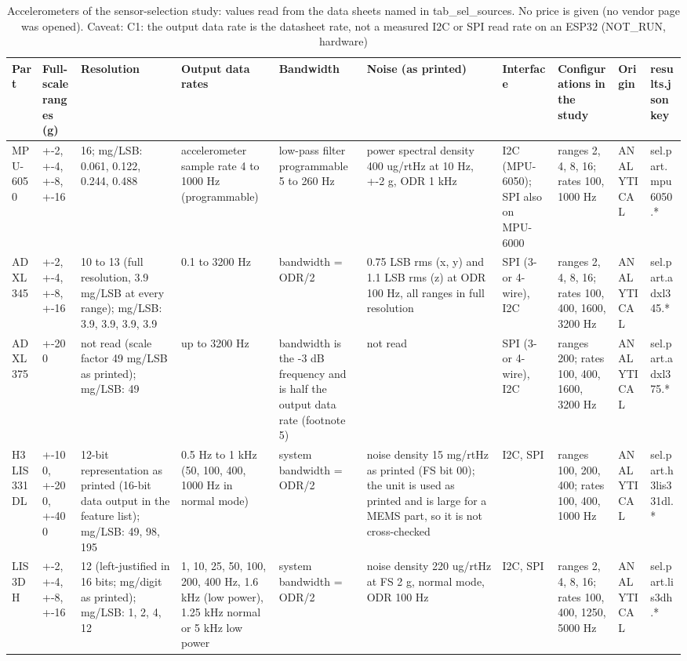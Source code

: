 \begin{table}[t]
\centering
\small
\caption{Accelerometers of the sensor-selection study: values read from the data sheets named in tab\_sel\_sources. No price is given (no vendor page was opened). Caveat: C1: the output data rate is the datasheet rate, not a measured I2C or SPI read rate on an ESP32 (NOT\_RUN, hardware)}
\label{tab:tab_sel_parts}
\begin{tabular}{llllllllll}
\toprule
Part & Full-scale ranges (g) & Resolution & Output data rates & Bandwidth & Noise (as printed) & Interface & Configurations in the study & Origin & results.json key \\
\midrule
MPU-6050 & +-2, +-4, +-8, +-16 & 16; mg/LSB: 0.061, 0.122, 0.244, 0.488 & accelerometer sample rate 4 to 1000 Hz (programmable) & low-pass filter programmable 5 to 260 Hz & power spectral density 400 ug/rtHz at 10 Hz, +-2 g, ODR 1 kHz & I2C (MPU-6050); SPI also on MPU-6000 & ranges 2, 4, 8, 16; rates 100, 1000 Hz & ANALYTICAL & sel.part.mpu6050.* \\
ADXL345 & +-2, +-4, +-8, +-16 & 10 to 13 (full resolution, 3.9 mg/LSB at every range); mg/LSB: 3.9, 3.9, 3.9, 3.9 & 0.1 to 3200 Hz & bandwidth = ODR/2 & 0.75 LSB rms (x, y) and 1.1 LSB rms (z) at ODR 100 Hz, all ranges in full resolution & SPI (3- or 4-wire), I2C & ranges 2, 4, 8, 16; rates 100, 400, 1600, 3200 Hz & ANALYTICAL & sel.part.adxl345.* \\
ADXL375 & +-200 & not read (scale factor 49 mg/LSB as printed); mg/LSB: 49 & up to 3200 Hz & bandwidth is the -3 dB frequency and is half the output data rate (footnote 5) & not read & SPI (3- or 4-wire), I2C & ranges 200; rates 100, 400, 1600, 3200 Hz & ANALYTICAL & sel.part.adxl375.* \\
H3LIS331DL & +-100, +-200, +-400 & 12-bit representation as printed (16-bit data output in the feature list); mg/LSB: 49, 98, 195 & 0.5 Hz to 1 kHz (50, 100, 400, 1000 Hz in normal mode) & system bandwidth = ODR/2 & noise density 15 mg/rtHz as printed (FS bit 00); the unit is used as printed and is large for a MEMS part, so it is not cross-checked & I2C, SPI & ranges 100, 200, 400; rates 100, 400, 1000 Hz & ANALYTICAL & sel.part.h3lis331dl.* \\
LIS3DH & +-2, +-4, +-8, +-16 & 12 (left-justified in 16 bits; mg/digit as printed); mg/LSB: 1, 2, 4, 12 & 1, 10, 25, 50, 100, 200, 400 Hz, 1.6 kHz (low power), 1.25 kHz normal or 5 kHz low power & system bandwidth = ODR/2 & noise density 220 ug/rtHz at FS 2 g, normal mode, ODR 100 Hz & I2C, SPI & ranges 2, 4, 8, 16; rates 100, 400, 1250, 5000 Hz & ANALYTICAL & sel.part.lis3dh.* \\

\end{tabular}
\end{table}
